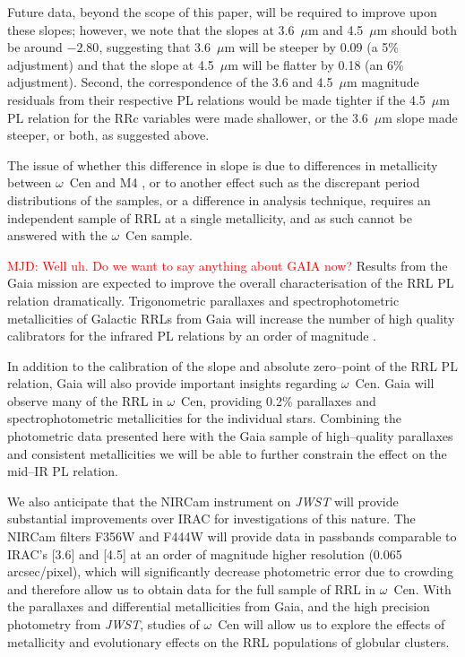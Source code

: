 \documentclass[a4paper,fleqn,usenatbib]{mnras}
\newcommand{\ocen}{$\omega$~Cen\xspace}
\newcommand{\um}{~$\mu$m\xspace}
\providecommand{\mjdcomment}[1]{{\textcolor{red}{{MJD: #1}}}\xspace}
\begin{document}
Future data, beyond the scope of this paper, will be required to improve upon these slopes; however, we note that the slopes at 3.6\um and 4.5\um should both be around $-2.80$, suggesting that 3.6\um will be steeper by 0.09 (a 5\% adjustment) and that the slope at 4.5\um  will be flatter by 0.18 (an 6\% adjustment). Second, the correspondence of the 3.6 and 4.5\um magnitude residuals from their respective PL relations would be made tighter if the 4.5\um PL relation for the RRc variables were made shallower, or the 3.6\um slope made steeper, or both, as suggested above.

The issue of whether this difference in slope is due to differences in metallicity between \ocen and M4 \citep[the calibrating sample in][]{2015ApJ...808...11N}, or to another effect such as the discrepant period distributions of the samples, or a difference in analysis technique, requires an independent sample of RRL at a single metallicity, and as such cannot be answered with the \ocen sample. 

\mjdcomment{Well uh. Do we want to say anything about GAIA now?}
Results from the Gaia mission \citep{1996A&AS..116..579L} are expected to improve the overall characterisation of the RRL PL relation dramatically. Trigonometric parallaxes and spectrophotometric metallicities of Galactic RRLs from Gaia will increase the number of high quality calibrators for the infrared PL relations by an order of magnitude \citep[Scowcroft et al. 2016b, in prep., Beaton et al. 2016, in prep.]{2012MNRAS.426.2463L}. 

In addition to the calibration of the slope and absolute zero--point of the RRL PL relation, Gaia will also provide important insights regarding \ocen. Gaia will observe many of the RRL in \ocen \citep{2002ASPC..265..415B}, providing 0.2\% parallaxes and spectrophotometric metallicities for the individual stars. Combining the photometric data presented here with the Gaia sample of high--quality parallaxes and consistent metallicities we will be able to further constrain the effect on the mid--IR PL relation.

We also anticipate that the NIRCam instrument on {\em JWST} \citep{2005SPIE.5904...21B, 2006SSRv..123..485G} will provide substantial improvements over IRAC for investigations of this nature. The NIRCam filters F356W and F444W will provide data in passbands comparable to IRAC's [3.6] and [4.5] at an order of magnitude higher resolution (0.065 arcsec/pixel), which will significantly decrease photometric error due to crowding and therefore allow us to obtain data for the full sample of RRL in \ocen. With the parallaxes and differential metallicities from Gaia, and the high precision photometry from {\it JWST}, studies of \ocen will allow us to explore the effects of metallicity and evolutionary effects on the RRL populations of globular clusters. 
\end{document}

